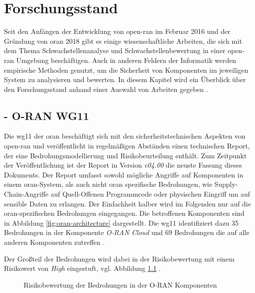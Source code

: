 \chapter{Forschungsstand}
\label{chap:forschungsstand}
Seit den Anfängen der Entwicklung von \gls{open-ran} im Februar 2016 und der Gründung von \gls{oran} 2018 gibt es einige wissenschaftliche Arbeiten, die sich mit dem Thema Schwachstellenanalyse und Schwachstellenbewertung in einer \gls{open-ran} Umgebung beschäftigen. Auch in anderen Feldern der Informatik werden empirische Methoden genutzt, um die Sicherheit von Komponenten im jeweiligen System zu analysieren und bewerten. In diesem Kapitel wird ein Überblick über den Forschungsstand anhand einer Auswahl von Arbeiten gegeben \autocite{Us} \autocite{GuideOpenRAN}.
%
\section{ - O-RAN WG11}
\label{sec:forschungsstand-wg11}
Die \gls{wg11} der \gls{oran} beschäftigt sich mit den sicherheitstechnischen Aspekten von \gls{open-ran} und veröffentlicht in regelmäßigen Abständen einen technischen Report, der eine Bedrohungsmodellierung und Risikobeurteilung enthält. Zum Zeitpunkt der Veröffentlichung ist der Report in Version \textit{\textsf{v04.00}} die neuste Fassung dieses Dokuments. Der Report umfasst sowohl mögliche Angriffe auf Komponenten in einem \gls{oran}-System, als auch nicht \gls{oran} spezifische Bedrohungen, wie Supply-Chain-Angriffe auf Quell-Offenen Programmcode oder physischen Eingriff um auf sensible Daten zu erlangen\autocite{o-ranworkgroup11securityworkgroupORANSecurityThreat2024}. Der Einfachheit halber wird im Folgenden nur auf die \gls{oran}-spezifischen Bedrohungen eingegangen. Die betroffenen Komponenten sind in Abbildung \ref{fig:oran-architecture} dargestellt. Die \gls{wg11} identifiziert dazu 35 Bedrohungen in der Komponente \textit{O-RAN Cloud} und 69 Bedrohungen die auf alle anderen Komponenten zutreffen \autocite[Seite 31 - 69]{o-ranworkgroup11securityworkgroupORANSecurityThreat2024}.
\par Der Großteil der Bedrohungen wird dabei in der Risikobewertung mit einem Risikowert von \textit{High} eingestuft, vgl. Abbildung \ref{fig:riskscore-oran-components} \autocite[Seite 130 - 164]{o-ranworkgroup11securityworkgroupORANSecurityThreat2024}.
%
\begin{figure}[H]
    \centering
    \label{fig:riskscore-oran-components}
    \caption{Risikobewertung der Bedrohungen in der O-RAN Komponenten}
\end{figure}
%
